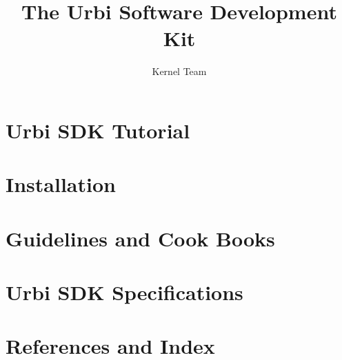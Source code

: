 \documentclass[openright,twoside,11pt]{book}
\title{The Urbi Software Development Kit}
\author{Kernel Team}
\begin{document}
\maketitle
\tableofcontents



\part{Urbi SDK Tutorial}



\part{Installation}


\part{Guidelines and Cook Books}



\part{Urbi SDK Specifications}


\part{References and Index}

\printindex
\end{document}

